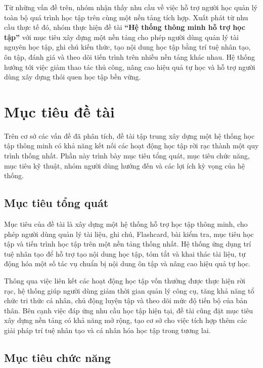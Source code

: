 Từ những vấn đề trên, nhóm nhận thấy nhu cầu về việc hỗ trợ người học quản lý toàn bộ quá trình học tập trên cùng một nền tảng tích hợp. Xuất phát từ nhu cầu thực tế đó, nhóm thực hiện đề tài \textbf{``Hệ thống thông minh hỗ trợ học tập''} với mục tiêu xây dựng một nền tảng cho phép người dùng quản lý tài nguyên học tập, ghi chú kiến thức, tạo nội dung học tập bằng trí tuệ nhân tạo, ôn tập, đánh giá và theo dõi tiến trình trên nhiều nền tảng khác nhau. Hệ thống hướng tới việc giảm thao tác thủ công, nâng cao hiệu quả tự học và hỗ trợ người dùng xây dựng thói quen học tập bền vững.

\section{Mục tiêu đề tài}

Trên cơ sở các vấn đề đã phân tích, đề tài tập trung xây dựng một hệ thống học tập thông minh có khả năng kết nối các hoạt động học tập rời rạc thành một quy trình thống nhất. Phần này trình bày mục tiêu tổng quát, mục tiêu chức năng, mục tiêu kỹ thuật, nhóm người dùng hướng đến và các lợi ích kỳ vọng của hệ thống.

\subsection{Mục tiêu tổng quát}

Mục tiêu của đề tài là xây dựng một hệ thống hỗ trợ học tập thông minh, cho phép người dùng quản lý tài liệu, ghi chú, Flashcard, bài kiểm tra, mục tiêu học tập và tiến trình học tập trên một nền tảng thống nhất. Hệ thống ứng dụng trí tuệ nhân tạo để hỗ trợ tạo nội dung học tập, tóm tắt và khai thác tài liệu, tự động hóa một số tác vụ chuẩn bị nội dung ôn tập và nâng cao hiệu quả tự học.

Thông qua việc liên kết các hoạt động học tập vốn thường được thực hiện rời rạc, hệ thống giúp người dùng giảm thời gian quản lý công cụ, tăng khả năng tổ chức tri thức cá nhân, chủ động luyện tập và theo dõi mức độ tiến bộ của bản thân. Bên cạnh việc đáp ứng nhu cầu học tập hiện tại, đề tài cũng đặt mục tiêu xây dựng nền tảng có khả năng mở rộng, tạo cơ sở cho việc tích hợp thêm các giải pháp trí tuệ nhân tạo và cá nhân hóa học tập trong tương lai.

\subsection{Mục tiêu chức năng}

